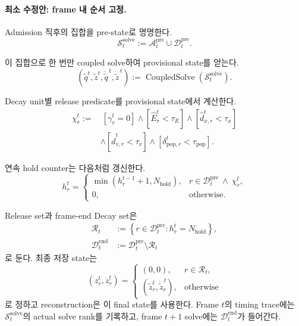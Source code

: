 \documentclass[11pt]{article}
\begin{document}
\paragraph{최소 수정안: frame 내 순서 고정.}
Admission 직후의 집합을 pre-state로 명명한다.
\begin{equation}
  \mathcal S_t^{\mathrm{solve}}
  :=
  \mathcal A_t^{\mathrm{pre}}\cup\mathcal D_t^{\mathrm{pre}}.
\end{equation}

이 집합으로 한 번만 coupled solve하여 provisional state를 얻는다.
\begin{equation}
  (\widetilde q^t,\widetilde z^t,
   \dot{\widetilde q}^{\,t},\dot{\widetilde z}^{\,t})
  :=
  \operatorname{CoupledSolve}(\mathcal S_t^{\mathrm{solve}}).
\end{equation}

Decay unit별 release predicate를 provisional state에서 계산한다.
\begin{equation}
\begin{aligned}
  \chi_r^t
  :=&\ [\gamma_r^t=0]
  \land[\widehat E_r^t<\tau_E]
  \land[\widehat d_{x,r}^t<\tau_x]\\
  &\land[\widehat d_{v,r}^t<\tau_v]
  \land[\delta_{\mathrm{pop},r}^t<\tau_{\mathrm{pop}}].
\end{aligned}
\end{equation}

연속 hold counter는 다음처럼 갱신한다.
\begin{equation}
  h_r^t
  =
  \begin{cases}
    \min(h_r^{t-1}+1,N_{\mathrm{hold}}),
      & r\in\mathcal D_t^{\mathrm{pre}}\ \land\ \chi_r^t,\\
    0, & \text{otherwise}.
  \end{cases}
\end{equation}

Release set과 frame-end Decay set은
\begin{align}
  \mathcal R_t
  &:=
  \left\{r\in\mathcal D_t^{\mathrm{pre}}:h_r^t=N_{\mathrm{hold}}\right\},\\
  \mathcal D_t^{\mathrm{end}}
  &:=
  \mathcal D_t^{\mathrm{pre}}\setminus\mathcal R_t
\end{align}
로 둔다. 최종 저장 state는
\begin{equation}
  (z_r^t,\dot z_r^t)
  =
  \begin{cases}
    (0,0), & r\in\mathcal R_t,\\
    (\widetilde z_r^t,\dot{\widetilde z}_r^{\,t}), & \text{otherwise}
  \end{cases}
\end{equation}
로 정하고 reconstruction은 이 final state를 사용한다.
Frame $t$의 timing trace에는 $\mathcal S_t^{\mathrm{solve}}$의 actual solve rank를 기록하고,
frame $t+1$ solve에는 $\mathcal D_t^{\mathrm{end}}$가 들어간다.
\end{document}
